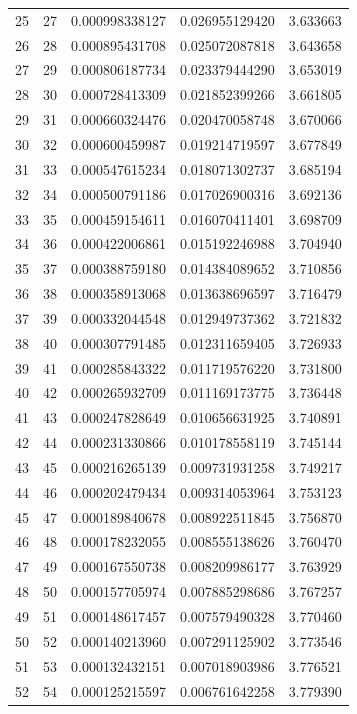 \documentclass[12pt,a4paper]{article}
\theoremstyle{definition}
\begin{document}
{\begin{longtable}{rr@{\quad}r@{\quad}r@{\quad}r}
25 & 27 & 0.000998338127 & 0.026955129420 & 3.633663 \\
26 & 28 & 0.000895431708 & 0.025072087818 & 3.643658 \\
27 & 29 & 0.000806187734 & 0.023379444290 & 3.653019 \\
28 & 30 & 0.000728413309 & 0.021852399266 & 3.661805 \\
29 & 31 & 0.000660324476 & 0.020470058748 & 3.670066 \\
30 & 32 & 0.000600459987 & 0.019214719597 & 3.677849 \\
31 & 33 & 0.000547615234 & 0.018071302737 & 3.685194 \\
32 & 34 & 0.000500791186 & 0.017026900316 & 3.692136 \\
33 & 35 & 0.000459154611 & 0.016070411401 & 3.698709 \\
34 & 36 & 0.000422006861 & 0.015192246988 & 3.704940 \\
35 & 37 & 0.000388759180 & 0.014384089652 & 3.710856 \\
36 & 38 & 0.000358913068 & 0.013638696597 & 3.716479 \\
37 & 39 & 0.000332044548 & 0.012949737362 & 3.721832 \\
38 & 40 & 0.000307791485 & 0.012311659405 & 3.726933 \\
39 & 41 & 0.000285843322 & 0.011719576220 & 3.731800 \\
40 & 42 & 0.000265932709 & 0.011169173775 & 3.736448 \\
41 & 43 & 0.000247828649 & 0.010656631925 & 3.740891 \\
42 & 44 & 0.000231330866 & 0.010178558119 & 3.745144 \\
43 & 45 & 0.000216265139 & 0.009731931258 & 3.749217 \\
44 & 46 & 0.000202479434 & 0.009314053964 & 3.753123 \\
45 & 47 & 0.000189840678 & 0.008922511845 & 3.756870 \\
46 & 48 & 0.000178232055 & 0.008555138626 & 3.760470 \\
47 & 49 & 0.000167550738 & 0.008209986177 & 3.763929 \\
48 & 50 & 0.000157705974 & 0.007885298686 & 3.767257 \\
49 & 51 & 0.000148617457 & 0.007579490328 & 3.770460 \\
50 & 52 & 0.000140213960 & 0.007291125902 & 3.773546 \\
51 & 53 & 0.000132432151 & 0.007018903986 & 3.776521 \\
52 & 54 & 0.000125215597 & 0.006761642258 & 3.779390 \\

\end{longtable}}
\end{document}
